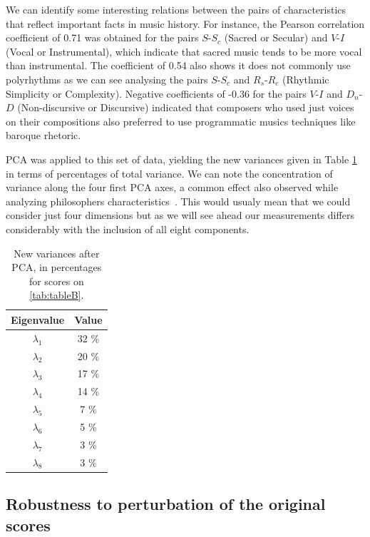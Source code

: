 \documentclass[
 aip,
 jmp,
 amsmath,amssymb,
 reprint,
]{revtex4-1}
\begin{document}
We can identify some interesting relations between the pairs of
characteristics that reflect important facts in music history. For
instance, the Pearson correlation coefficient of 0.71 was obtained for
the pairs $S$-$S_c$ (Sacred or Secular) and $V$-$I$ (Vocal or Instrumental),
which indicate that sacred music tends to be more vocal than
instrumental. The coefficient of 0.54 also shows it does not commonly use polyrhythms as we can see
analysing the pairs $S$-$S_c$ and $R_s$-$R_c$ (Rhythmic Simplicity or Complexity).
Negative coefficients of -0.36 for the pairs $V$-$I$ and $D_n$-$D$
(Non-discursive or Discursive) indicated that composers who used
just voices on their compositions also preferred to use programmatic
musics techniques like baroque rhetoric.

PCA was applied to this set of data, yielding the new variances given
in Table \ref{tab:tableC} in terms of percentages of total variance.
We can note the concentration of variance along the four
first PCA axes, a common effect also observed while analyzing
philosophers characteristics~\cite{Fabbri}. This would usualy mean that we could
consider just four dimensions but as we will see ahead our measurements
differs considerably with the inclusion of all eight components.

\begin{table}[ht]
\caption{\label{tab:tableC}New variances after PCA, in percentages for
  scores on \ref{tab:tableB}.}

\begin{tabular}{|c||c|}
\hline
Eigenvalue  & Value     \\ \hline

$\lambda_1$ &  32 \% \\
$\lambda_2$ &  20 \% \\
$\lambda_3$ &  17 \% \\
$\lambda_4$ &  14 \% \\
$\lambda_5$ &   7 \% \\
$\lambda_6$ &   5 \% \\
$\lambda_7$ &   3 \% \\
$\lambda_8$ &   3 \% \\
\hline

\end{tabular}
\end{table}

\subsection{Robustness to perturbation of the original scores}
\end{document}
